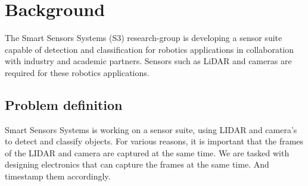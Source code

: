 \chapter{Background}

The Smart Sensors Systems (S3) research-group is developing a sensor suite capable of detection and classification for robotics applications in collaboration with industry and academic partners. Sensors such as LiDAR and cameras are required for these robotics applications.

\section{Problem definition}

Smart Sensors Systems is working on a sensor suite, using LIDAR and camera's to
detect and classify objects. For various reasons, it is important that the
frames of the LIDAR and camera are captured at the same time. We are tasked
with designing electronics that can capture the frames at the same time. And
timestamp them accordingly.
